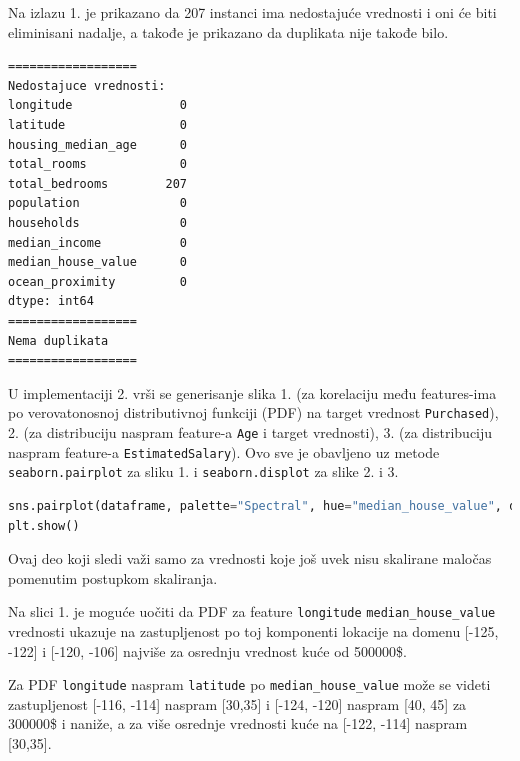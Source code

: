 \documentclass[fontsize=12bp, paper=a4]{scrarticle}
\renewcommand\lstlistingname{Implementacija}
\renewcommand\lstlistlistingname{Implementacija}
\begin{document}
Na izlazu 1. je prikazano da 207 instanci ima nedostajuće vrednosti i oni će biti eliminisani nadalje, a takođe je prikazano da duplikata nije takođe bilo. 

\renewcommand\lstlistingname{Izlaz}
\renewcommand\lstlistlistingname{Izlaz}
\setcounter{lstlisting}{0}
\begin{lstlisting}[caption=Nedostajuće vrednosti i duplikati]
==================
Nedostajuce vrednosti:
longitude               0
latitude                0
housing_median_age      0
total_rooms             0
total_bedrooms        207
population              0
households              0
median_income           0
median_house_value      0
ocean_proximity         0
dtype: int64
==================
Nema duplikata
==================
\end{lstlisting}

\vbox{}

\vbox{}

U implementaciji 2. vrši se generisanje slika 1. (za korelaciju među features-ima po verovatonosnoj distributivnoj funkciji (PDF) na target vrednost \verb|Purchased|), 2. (za distribuciju naspram feature-a \verb|Age| i target vrednosti), 3. (za distribuciju naspram feature-a \verb|EstimatedSalary|). Ovo sve je obavljeno uz metode \verb|seaborn.pairplot| za sliku 1.\cite{pairplot} i \verb|seaborn.displot| za slike 2. i 3.\cite{displot}

\renewcommand\lstlistingname{Implementacija}
\renewcommand\lstlistlistingname{Implementacija}
\setcounter{lstlisting}{1}
\begin{lstlisting}[language=Python, caption=Navođenje načina vizuelizacija za sliku \texttt{1.}]
sns.pairplot(dataframe, palette="Spectral", hue="median_house_value", dropna=True)
plt.show()
\end{lstlisting}

Ovaj deo koji sledi važi samo za vrednosti koje još uvek nisu skalirane maločas pomenutim postupkom skaliranja.

Na slici 1. je moguće uočiti da PDF za feature \verb*|longitude| \verb*|median_house_value| vrednosti ukazuje na zastupljenost po toj komponenti lokacije na domenu [-125, -122] i [-120, -106] najviše za osrednju vrednost kuće od 500000\$.

Za PDF \verb*|longitude| naspram \verb*|latitude| po \verb|median_house_value| može se videti zastupljenost [-116, -114] naspram [30,35] i [-124, -120] naspram [40, 45] za 300000\$ i naniže, a za više osrednje vrednosti kuće na [-122, -114] naspram [30,35].
\end{document}
